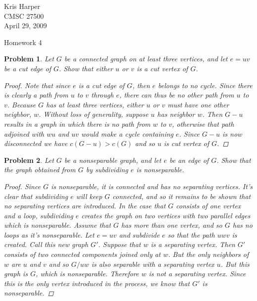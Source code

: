 \documentclass{article}
\newtheorem{problem}{Problem}
\begin{document}
\begin{flushright}
Kris Harper\\

CMSC 27500\\

April 29, 2009
\end{flushright}

\begin{center}
Homework 4
\end{center}

\begin{flushleft}

\begin{problem}
Let $G$ be a connected graph on at least three vertices, and let $e = uv$ be a cut edge of $G$. Show that either $u$ or $v$ is a cut vertex of $G$.
\begin{proof}
Note that since $e$ is a cut edge of $G$, then $e$ belongs to no cycle. Since there is clearly a path from $u$ to $v$ through $e$, there can thus be no other path from $u$ to $v$. Because $G$ has at least three vertices, either $u$ or $v$ must have one other neighbor, $w$. Without loss of generality, suppose $u$ has neighbor $w$. Then $G-u$ results in a graph in which there is no path from $w$ to $v$, otherwise that path adjoined with $wu$ and $uv$ would make a cycle containing $e$. Since $G-u$ is now disconnected we have $c(G-u) > c(G)$ and so $u$ is cut vertex of $G$.
\end{proof}
\end{problem}

\begin{problem}
Let $G$ be a nonseparable graph, and let $e$ be an edge of $G$. Show that the graph obtained from $G$ by subdividing $e$ is nonseparable.
\begin{proof}
Since $G$ is nonseparable, it is connected and has no separating vertices. It's clear that subdividing $e$ will keep $G$ connected, and so it remains to be shown that no separating vertices are introduced. In the case that $G$ consists of one vertex and a loop, subdividing $e$ creates the graph on two vertices with two parallel edges which is nonseparable. Assume that $G$ has more than one vertex, and so $G$ has no loops as it's nonseparable. Let $e = uv$ and subdivide $e$ so that the path $uwv$ is created. Call this new graph $G'$. Suppose that $w$ is a separating vertex. Then $G'$ consists of two connected components joined only at $w$. But the only neighbors of $w$ are $u$ and $v$ and so $G / uw$ is also separable with a separating vertex $u$. But this graph is $G$, which is nonseparable. Therefore $w$ is not a separating vertex. Since this is the only vertex introduced in the process, we know that $G'$ is nonseparable.
\end{proof}
\end{problem}


\end{flushleft}
\end{document}
